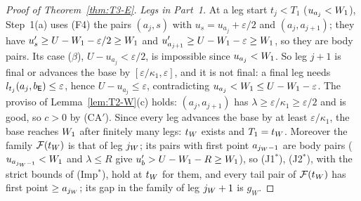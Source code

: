 \begin{proof}[Proof of Theorem~\ref{thm:T3-E}]
\emph{Legs in Part~1.} At a leg start $t_j<T_1$ ($u_{a_j}<W_1$), Step~1(a) uses (F4) the pairs $(a_j,s)$ with
$u_s=u_{a_j}+\varepsilon/2$ and $(a_j,a_{j+1})$; they have $u_s'\ge U-W_1-\varepsilon/2\ge W_1$ and
$u'_{a_{j+1}}\ge U-W_1-\varepsilon\ge W_1$, so they are body pairs. Its case ($\beta$), $U-u_{a_j}<\varepsilon/2$, is impossible since
$u_{a_j}<W_1$. So leg $j+1$ is final or advances the base by $[\varepsilon/\kappa_1,\varepsilon]$, and it is not final: a final leg
needs $l_{t_j}(a_j,b_{\mathsf E})\le\varepsilon$, hence $U-u_{a_j}\le\varepsilon$, contradicting $u_{a_j}<W_1\le U-W_1-\varepsilon$. The
proviso of Lemma~\ref{lem:T2-W}(c) holds: $(a_j,a_{j+1})$ has $\lambda\ge\varepsilon/\kappa_1\ge\varepsilon/2$ and is good, so
$c>0$ by (CA$'$). Since every leg advances the base by at least $\varepsilon/\kappa_1$, the base reaches $W_1$ after finitely many
legs: $t_W$ exists and $T_1=t_W$. Moreover the family $\mathcal F(t_W)$ is that of leg $j_W$; its pairs with first point
$a_{j_W-1}$ are body pairs ($u_{a_{j_W-1}}<W_1$ and $\lambda\le R$ give $u_b'>U-W_1-R\ge W_1$), so (J1$^*$), (J2$^*$), with
the strict bounds of (Imp$^*$), hold at $t_W$ for them, and every tail pair of $\mathcal F(t_W)$ has first point $\ge a_{j_W}$; its
gap in the family of leg $j_W+1$ is $g_W$.


\end{proof}
